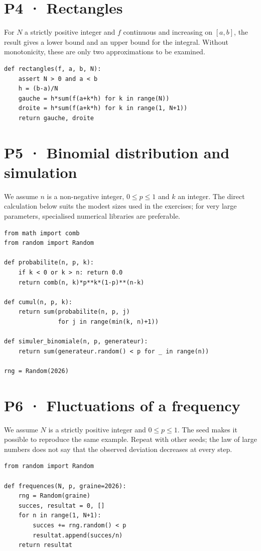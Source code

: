 \section{P4 · Rectangles}
For $N$ a strictly positive integer and $f$ continuous and increasing on $[a,b]$, the result gives a lower bound and an upper bound for the integral. Without monotonicity, these are only two approximations to be examined.
\begin{lstlisting}
def rectangles(f, a, b, N):
    assert N > 0 and a < b
    h = (b-a)/N
    gauche = h*sum(f(a+k*h) for k in range(N))
    droite = h*sum(f(a+k*h) for k in range(1, N+1))
    return gauche, droite
\end{lstlisting}
\mxnewpage\section{P5 · Binomial distribution and simulation}
We assume $n$ is a non-negative integer, $0\le p\le1$ and $k$ an integer. The direct calculation below suits the modest sizes used in the exercises; for very large parameters, specialised numerical libraries are preferable.
\begin{lstlisting}
from math import comb
from random import Random

def probabilite(n, p, k):
    if k < 0 or k > n: return 0.0
    return comb(n, k)*p**k*(1-p)**(n-k)

def cumul(n, p, k):
    return sum(probabilite(n, p, j)
               for j in range(min(k, n)+1))

def simuler_binomiale(n, p, generateur):
    return sum(generateur.random() < p for _ in range(n))

rng = Random(2026)
\end{lstlisting}
\section{P6 · Fluctuations of a frequency}
We assume $N$ is a strictly positive integer and $0\le p\le1$. The seed makes it possible to reproduce the same example. Repeat with other seeds; the law of large numbers does not say that the observed deviation decreases at every step.
\begin{lstlisting}
from random import Random

def frequences(N, p, graine=2026):
    rng = Random(graine)
    succes, resultat = 0, []
    for n in range(1, N+1):
        succes += rng.random() < p
        resultat.append(succes/n)
    return resultat
\end{lstlisting}
